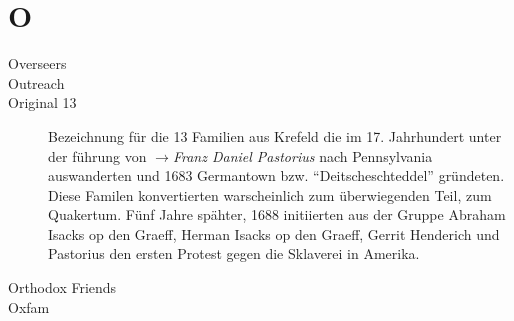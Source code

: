 \section*{O}

\articlesize

\begin{description}
 \item[Overseers]

 \item[Outreach]

 \item[Original 13] Bezeichnung für die 13 Familien aus Krefeld die im 17.
 Jahrhundert unter der führung von $\to$\textit{Franz Daniel Pastorius} nach
 Pennsylvania auswanderten und 1683 Germantown bzw. "`Deitscheschteddel"' gründeten.
 Diese Familen konvertierten warscheinlich zum überwiegenden Teil, zum Quakertum.
 Fünf Jahre spähter, 1688 initiierten aus der Gruppe Abraham Isacks op den Graeff,
 Herman Isacks op den Graeff, Gerrit Henderich und Pastorius den ersten Protest
 gegen die Sklaverei in Amerika.

 \item[Orthodox Friends]

 \item[Oxfam]
 \end{description}

\normalsize
